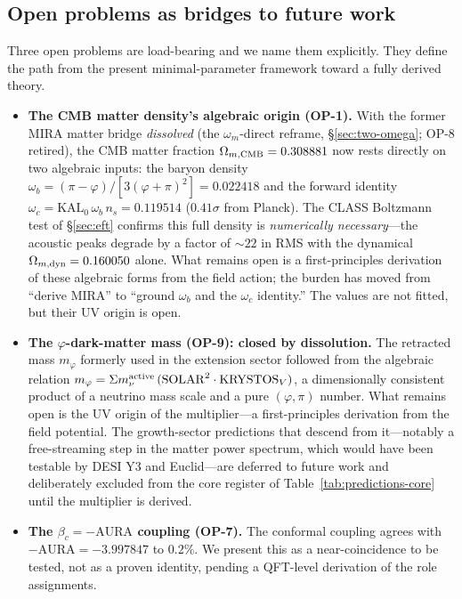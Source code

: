 \documentclass[aps,prd,preprint,amsmath,amssymb,nofootinbib,longbibliography]{revtex4-2}
\begin{document}
\subsection{Open problems as bridges to future work}

Three open problems are load-bearing and we name them explicitly. They define
the path from the present minimal-parameter framework toward a fully derived
theory.

\begin{itemize}
\item \textbf{The CMB matter density's algebraic origin (OP-1).} With the
former MIRA matter bridge \emph{dissolved} (the $\omega_m$-direct reframe,
\S\ref{sec:two-omega}; OP-8 retired), the CMB matter fraction
$\Omega_{m,\rm CMB}=0.308881$ now rests directly on two algebraic inputs: the
baryon density $\omega_b=(\pi-\varphi)/[3(\varphi+\pi)^2]=0.022418$ and the forward
identity $\omega_c=\mathrm{KAL}_0\,\omega_b\,n_s=0.119514$ ($0.41\sigma$ from
Planck). The CLASS Boltzmann test of \S\ref{sec:eft} confirms this full density
is \emph{numerically necessary}---the acoustic peaks degrade by a factor of
$\sim22$ in RMS with the dynamical $\Omega_{m,\rm dyn}=0.160050$ alone. What remains
open is a first-principles derivation of these algebraic forms from the field
action; the burden has moved from ``derive MIRA'' to ``ground $\omega_b$ and the
$\omega_c$ identity.'' The values are not fitted, but their UV origin is open.

\item \textbf{The $\varphi$-dark-matter mass (OP-9): closed by dissolution.} The retracted mass
$m_\varphi$ formerly used in the extension sector followed from the
algebraic relation $m_\varphi=\Sigma m_\nu^{\rm active}\,(\mathrm{SOLAR}^2\cdot\mathrm{KRYSTOS}_V)$,
a dimensionally consistent product of a neutrino mass scale and a pure
$(\varphi,\pi)$ number. What remains open is the UV origin of the
multiplier---a first-principles derivation from the field potential. The
growth-sector predictions that descend from it---notably a free-streaming step
in the matter power spectrum, which would have been testable by
DESI Y3 and Euclid---are deferred to future work and deliberately excluded from
the core register of Table~\ref{tab:predictions-core} until the multiplier is
derived.

\item \textbf{The $\beta_c=-\mathrm{AURA}$ coupling (OP-7).} The conformal
coupling agrees with $-\mathrm{AURA}=-3.997847$ to $0.2\%$. We present this as a
near-coincidence to be tested, not as a proven identity, pending a QFT-level
derivation of the role assignments.
\end{itemize}
\end{document}
